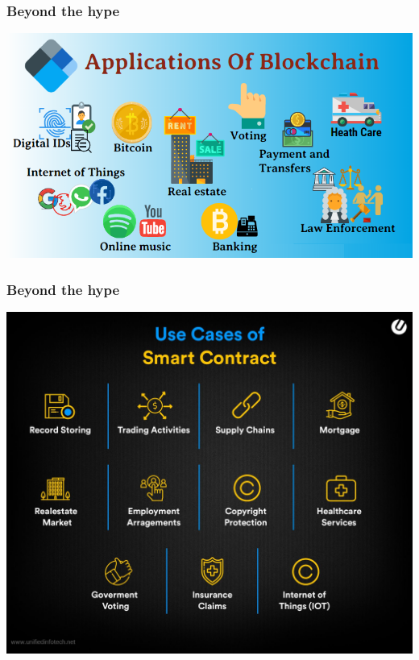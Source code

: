 \documentclass[11pt]{beamer}  %
\begin{document}
\begin{frame}\frametitle{Beyond the hype}

  \begin{center}
    \includegraphics[scale=0.4,clip=false]{pictures/blockchain-applications.png}
  \end{center}

\end{frame}

\begin{frame}\frametitle{Beyond the hype}

  \begin{center}
    \includegraphics[scale=0.16,clip=false]{pictures/smart-contract-applications.jpg}
  \end{center}

\end{frame}
\end{document}
